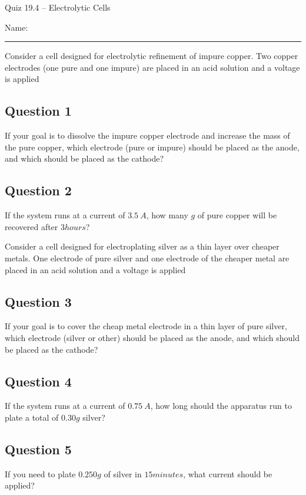 \documentclass[11pt, letterpaper]{memoir}
\begin{document}
	\begin{center}
		{\large	Quiz 19.4 -- Electrolytic Cells}
	\end{center}
  {\large Name: \rule[-1mm]{4in}{.1pt}}

\noindent
Consider a cell designed for electrolytic refinement of impure copper. Two copper electrodes (one pure and one impure) are placed in an acid solution and a voltage is applied

\subsection*{Question 1}
If your goal is to dissolve the impure copper electrode and increase the mass of the pure copper, which electrode (pure or impure) should be placed as the anode, and which should be placed as the cathode?

\vspace{2em}
\subsection*{Question 2}
If the system runs at a current of $3.5~A$, how many $g$ of pure copper will be recovered after $3hours$?

\vspace{7em}
\noindent
Consider a cell designed for electroplating silver as a thin layer over cheaper metals. One electrode of pure silver and one electrode of the cheaper metal are placed in an acid solution and a voltage is applied

\subsection*{Question 3}
If your goal is to cover the cheap metal electrode in a thin layer of pure silver, which electrode (silver or other) should be placed as the anode, and which should be placed as the cathode?

\vspace{2em}
\subsection*{Question 4}
If the system runs at a current of $0.75~A$, how long should the apparatus run to plate a total of $0.30g$ silver?

\vspace{7em}
\subsection*{Question 5}
If you need to plate $0.250g$ of silver in $15minutes$, what current should be applied?
	\newpage
	\pagestyle{empty}
	\addtocounter{page}{-1}
\end{document}
